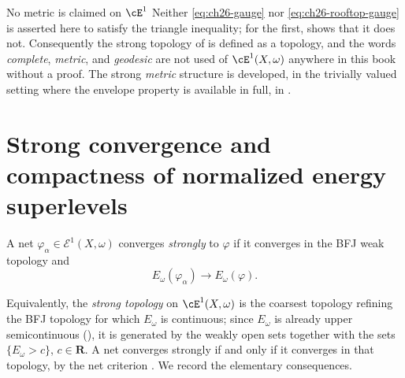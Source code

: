 \begin{warning}{No metric is claimed on $\cE^1$}
Neither \eqref{eq:ch26-gauge} nor \eqref{eq:ch26-rooftop-gauge} is asserted
here to satisfy the triangle inequality; for the first,
 shows that it does not.  Consequently the
strong topology of  is defined as a topology, and the
words \emph{complete}, \emph{metric}, and \emph{geodesic} are not used of
$\cE^1(X,\omega)$ anywhere in this book without a proof.  The strong
\emph{metric} structure is developed, in the trivially valued setting where
the envelope property is available in full, in
.
\end{warning}

\section{Strong convergence and compactness of normalized energy superlevels}
\label{sec:ch26-strong}

\begin{definition}
\label{def:ch26-strong-convergence}
A net $\varphi_\alpha\in\mathcal E^1(X,\omega)$ converges
\emph{strongly} to $\varphi$ if it converges in the BFJ weak topology and
\[
                   E_\omega(\varphi_\alpha)\to E_\omega(\varphi).
\]
\end{definition}

Equivalently, the \emph{strong topology} on $\cE^1(X,\omega)$ is the
coarsest topology refining the BFJ topology for which $E_\omega$ is
continuous; since $E_\omega$ is already upper semicontinuous
(), it is generated by the weakly open sets
together with the sets $\{E_\omega>c\}$, $c\in\mathbf R$.  A net
converges strongly if and only if it converges in that topology, by the net
criterion .  We record the elementary consequences.

